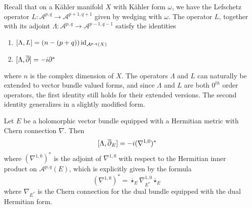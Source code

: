 %
Recall that on a K\"ahler manifold $X$ with K\"ahler form $\omega$, we have the
Lefschetz operator $L : \mathcal{A}^{p,q} \to \mathcal{A}^{p+1,q+1}$ given by
wedging with $\omega$. The operator $L$, together with its adjoint
$\Lambda : \mathcal{A}^{p,q} \to \mathcal{A}^{p-1,q-1}$
satisfy the identities
\begin{enumerate}
  \item $[\Lambda, L] = (n-(p+q))\operatorname{id}_{\mathcal{A}^{p,q}(X)}$
  \item $[\Lambda,\overline{\partial}] = -i\partial^*$
\end{enumerate}
%
where $n$ is the complex dimension of $X$. The operators $\Lambda$ and $L$ can
naturally be extended to vector bundle valued forms, and since $\Lambda$ and
$L$ are both $0^{th}$ order operators, the first identity still holds for
their extended versions. The second identity generalizes in a slightly modified
form.
%
\begin{prop}
Let $E$ be a holomorphic vector bundle equipped with a Hermitian metric with
Chern connection $\nabla$. Then
\[
[\Lambda, \overline{\partial}_E] = -i(\nabla^{1,0})^*
\]
where $(\nabla^{1,0})^*$ is the adjoint of $\nabla^{1,0}$ with respect to the
Hermitian inner product on $\mathcal{A}^{p,q}(E)$, which is explicitly given by the
formula
\[
(\nabla^{1,0})^* = \overline{\star}_E\nabla^{1,0}_{E^*}\overline{\star}_E
\]
where $\nabla_{E^*}$ is the Chern connection for the dual bundle equipped with
the dual Hermitian form.
\end{prop}
%

